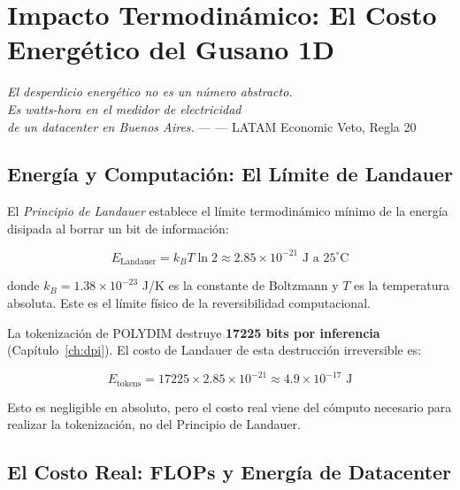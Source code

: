 \chapter{Impacto Termodinámico: El Costo Energético del Gusano 1D}


\textit{El desperdicio energético no es un número abstracto.\\
Es watts-hora en el medidor de electricidad\\
de un datacenter en Buenos Aires.} --- --- LATAM Economic Veto, Regla 20

\section{Energía y Computación: El Límite de Landauer}

El \textit{Principio de Landauer} establece el límite termodinámico mínimo de la
energía disipada al borrar un bit de información:

\begin{equation}
E_{\text{Landauer}} = k_B T \ln 2 \approx 2.85 \times 10^{-21} \text{ J a } 25^\circ\text{C}

\end{equation}

donde $k_B = 1.38 \times 10^{-23}$ J/K es la constante de Boltzmann y $T$ es la
temperatura absoluta. Este es el límite físico de la reversibilidad computacional.

La tokenización de POLYDIM destruye \textbf{17225 bits por inferencia} (Capítulo~\ref{ch:dpi}).
El costo de Landauer de esta destrucción irreversible es:

\begin{equation}
E_{\text{tokens}} = 17225 \times 2.85 \times 10^{-21} \approx 4.9 \times 10^{-17} \text{ J}
\end{equation}

Esto es negligible en absoluto, pero el costo real viene del cómputo necesario
para realizar la tokenización, no del Principio de Landauer.

\section{El Costo Real: FLOPs y Energía de Datacenter}

